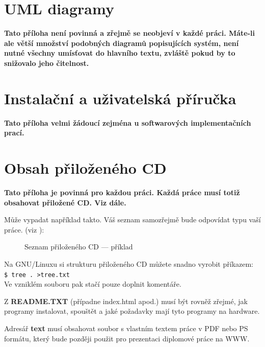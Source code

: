 \documentclass[11pt,oneside,a4paper]{book}
\begin{document}
\chapter{UML diagramy}
\textbf{\large Tato příloha není povinná a zřejmě se neobjeví v každé práci. Máte-li ale větší množství podobných diagramů popisujících systém, není nutné všechny umísťovat do hlavního textu, zvláště pokud by to snižovalo jeho čitelnost.}

\chapter{Instalační a uživatelská příručka}
\textbf{\large Tato příloha velmi žádoucí zejména u softwarových implementačních prací.}

\chapter{Obsah přiloženého CD}
\textbf{\large Tato příloha je povinná pro každou práci. Každá práce musí totiž obsahovat přiložené CD. Viz dále.}

Může vypadat například takto. Váš seznam samozřejmě bude odpovídat typu vaší práce. (viz \cite{infodp}):

\begin{figure}[h]
\begin{center}
\caption{Seznam přiloženého CD --- příklad}
\end{center}
\end{figure}

Na GNU/Linuxu si strukturu přiloženého CD můžete snadno vyrobit příkazem:\\ 
\verb|$ tree . >tree.txt|\\
Ve vzniklém souboru pak stačí pouze doplnit komentáře.

Z \textbf{README.TXT} (případne index.html apod.)  musí být rovněž zřejmé, jak programy instalovat, spouštět a jaké požadavky mají tyto programy na hardware.

Adresář \textbf{text}  musí obsahovat soubor s vlastním textem práce v PDF nebo PS formátu, který bude později použit pro prezentaci diplomové práce na WWW.
\end{document}
